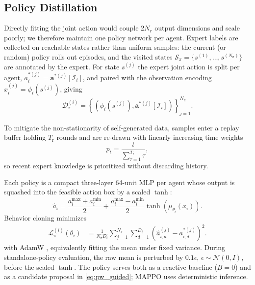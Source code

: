 \documentclass[letterpaper,10pt,conference]{ieeeconf}
\begin{document}
\subsection{Policy Distillation}

Directly fitting the joint action would couple $2N_r$ output dimensions
and scale poorly; we therefore maintain one policy network per agent.
Expert labels are collected on reachable states rather than uniform
samples: the current (or random) policy rolls out episodes, and the
visited states $\mathcal{S}_\pi=\{s^{(1)},\dots,s^{(N_\pi)}\}$ are
annotated by the expert. For state $s^{(j)}$ the expert joint action is
split per agent, $a_i^{*(j)}=\mathbf{a}^{*(j)}[\mathcal{I}_i]$, and
paired with the observation encoding
$x_i^{(j)}=\phi_i(s^{(j)})$, giving
\begin{equation}
\mathcal{D}_{\pi}^{(i)}
=
\left\{
\left(\phi_i(s^{(j)}),\mathbf a^{*(j)}[\mathcal I_i]\right)
\right\}_{j=1}^{N_\pi}.
\end{equation}

To mitigate the non-stationarity of self-generated data, samples enter a
replay buffer holding $T_{\mathrm r}$ rounds and are re-drawn with
linearly increasing time weights
\begin{equation}
p_t=\frac{t}{\sum_{\tau=1}^{T_{\mathrm r}}\tau},
\label{eq:replay}
\end{equation}
so recent expert knowledge is prioritized without discarding history.

Each policy is a compact three-layer 64-unit MLP per agent whose output
is squashed into the feasible action box by a scaled $\tanh$:
\begin{equation}
\hat{a}_i
=
\frac{a_i^{\max}+a_i^{\min}}{2}
+
\frac{a_i^{\max}-a_i^{\min}}{2}
\tanh\!\left(\mu_{\theta_i}(x_i)\right).
\end{equation}
Behavior cloning minimizes
\begin{equation}
\begin{aligned}
\mathcal{L}_{\pi}^{(i)}(\theta_i)
&=\frac{1}{N_\pi D_i}
\sum_{j=1}^{N_\pi}\sum_{d=1}^{D_i}
\left(\hat a_{i,d}^{(j)}-a_{i,d}^{*(j)}\right)^2 .
\end{aligned}
\label{eq:bc_loss}
\end{equation}
with AdamW \cite{loshchilov2019decoupled}, equivalently fitting the mean
under fixed variance. During standalone-policy evaluation, the raw mean
is perturbed by $0.1\epsilon$, $\epsilon\sim\mathcal N(0,I)$, before the
scaled $\tanh$. The policy serves both as a reactive baseline ($B=0$)
and as a candidate proposal in \eqref{eq:pw_guided}; MAPPO uses
deterministic inference.
\end{document}
